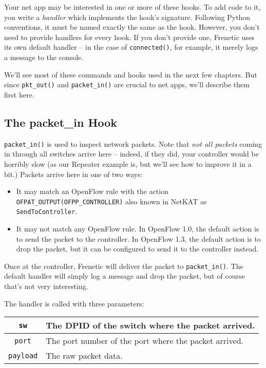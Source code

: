 \bigskip
Your net app may be interested in one or more of these hooks.
To add code to it, you write a \emph{handler} which implements the hook's signature.
Following Python conventions, it must be named exactly the same as the hook.
However, you don't need to provide handlers for every hook.
If you don't provide one, Frenetic uses its own default handler -- in the case of \texttt{connected()}, for example, it
merely logs a message to the console.  

We'll see most of these commands and hooks used in the next few chapters.  
But since \texttt{pkt\_out()} and \texttt{packet\_in()} are crucial to net apps, we'll describe them first here.

\subsection{The packet\_in Hook}
\label{introduction:packet_in}

\texttt{packet\_in()} is used to inspect network packets.  
Note that \emph{not all packets} coming in through all switches 
arrive here -- indeed, if they did, your controller would be
horribly slow (as our Repeater example is, but we'll see how to improve it in a bit.)
Packets arrive here in one of two ways:

\begin{itemize}
\item It may match an OpenFlow rule with the action \texttt{OFPAT\_OUTPUT(OFPP\_CONTROLLER)}
also known in NetKAT as \texttt{SendToController}.
\item It may not match any OpenFlow rule.  
In OpenFlow 1.0, the default action is to send the packet to the controller.
In OpenFlow 1.3, the default action is to drop the packet, but it can be configured to send it to the controller 
instead.  
\end{itemize}

Once at the controller, Frenetic will deliver the packet to \texttt{packet\_in()}. 
The default handler will simply log a message and drop the packet, but of course that's not very interesting.

The handler is called with three parameters:

\bigskip
\begin{tabularx}{6in}{|c|X|}
\hline\hline
\texttt{sw} & The DPID of the switch where the packet arrived.
\\ \hline
\texttt{port} & The port number of the port where the packet arrived.
\\ \hline
\texttt{payload} & The raw packet data.
\\ \hline\hline
\end{tabularx}

